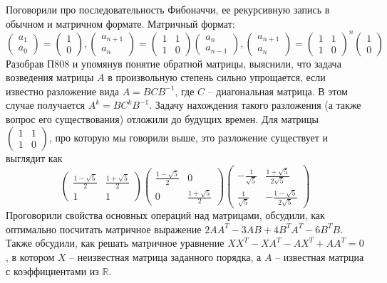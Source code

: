 \documentclass[10pt, a4paper]{extarticle}
\def \R{\mathbb{R}}
\theoremstyle{definition}
\begin{document}
Поговорили про последовательность Фибоначчи, ее рекурсивную запись в обычном и матричном формате. 
Матричный формат:
\[
    \begin{pmatrix}
        a_1 \\ a_0
    \end{pmatrix} =
    \begin{pmatrix}
        1 \\ 0
    \end{pmatrix} , 
    \begin{pmatrix}
        a_{n+1}\\ a_n
    \end{pmatrix} =
    \begin{pmatrix}
        1 & 1 \\ 1 & 0
    \end{pmatrix}
    \begin{pmatrix}
        a_n\\ a_{n-1}
    \end{pmatrix}, 
    \begin{pmatrix}
        a_{n+1}\\ a_n
    \end{pmatrix} =
    \begin{pmatrix}
        1 & 1 \\ 1 & 0
    \end{pmatrix}^n
    \begin{pmatrix}
        1\\ 0
    \end{pmatrix}
\]
Разобрав П808 и упомянув понятие обратной матрицы, выяснили, что задача возведения матрицы $A$
в произвольную степень сильно упрощается, если известно разложение вида $A = BCB^{-1}$, где $C$ --
диагональная матрица. В этом случае получается $A^k = BC^k B^{-1}$. Задачу нахождения такого разложения
(а также вопрос его существования) отложили до будущих времен. Для матрицы 
$\begin{pmatrix}
    1 & 1 \\ 1 & 0
\end{pmatrix}$, 
про которую мы говорили выше, это разложение существует и выглядит как
\[
    \begin{pmatrix}
        \frac{1-\sqrt{5}}{2} & \frac{1+\sqrt{5}}{2}\\ 1 & 1
    \end{pmatrix}
    \begin{pmatrix}
        \frac{1-\sqrt{5}}{2} & 0 \\ 0 & \frac{1+\sqrt{5}}{2}
    \end{pmatrix}
    \begin{pmatrix}
        -\frac{1}{\sqrt{5}} & \frac{1+\sqrt{5}}{2\sqrt{5}}\\ 
        \frac{1}{\sqrt{5}} & -\frac{1-\sqrt{5}}{2\sqrt{5}}
    \end{pmatrix}    
\]
Проговорили свойства основных операций над матрицами, обсудили, как оптимально посчитать матричное
выражение $2 A A^T - 3AB + 4 B^T A^T - 6B^TB$. Также обсудили, как решать матричное уравнение 
$XX^T - XA^T - AX^T + AA^T=0$, в котором $X$ -- неизвестная матрица заданного порядка, а 
$A$ -- известная матрциа с коэффициентами из $\R$.
\end{document}
